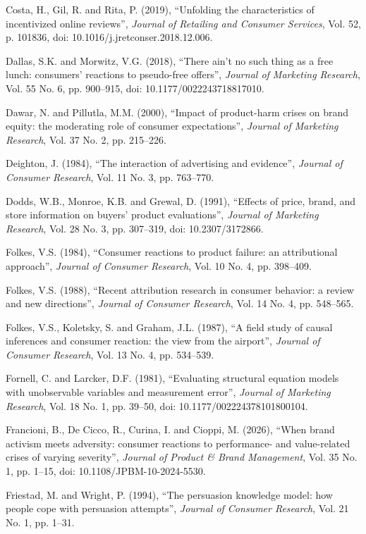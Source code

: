 \documentclass[12pt, a4paper]{article}
\newenvironment{referenceshang}{%
  \par\begingroup
  \setlength{\parindent}{0pt}%
  \setlength{\parskip}{0.5\baselineskip}%
  \everypar{\hangindent=1.5em\hangafter=1\relax}%
  \ignorespaces
}{%
  \par\endgroup
}
\begin{document}
\begin{referenceshang}
Costa, H., Gil, R. and Rita, P. (2019), ``Unfolding the characteristics of incentivized online reviews'', \emph{Journal of Retailing and Consumer Services}, Vol. 52, p. 101836, doi: 10.1016/j.jretconser.2018.12.006.

Dallas, S.K. and Morwitz, V.G. (2018), ``There ain't no such thing as a free lunch: consumers' reactions to pseudo-free offers'', \emph{Journal of Marketing Research}, Vol. 55 No. 6, pp. 900--915, doi: 10.1177/0022243718817010.

Dawar, N. and Pillutla, M.M. (2000), ``Impact of product-harm crises on brand equity: the moderating role of consumer expectations'', \emph{Journal of Marketing Research}, Vol. 37 No. 2, pp. 215--226.

Deighton, J. (1984), ``The interaction of advertising and evidence'', \emph{Journal of Consumer Research}, Vol. 11 No. 3, pp. 763--770.

Dodds, W.B., Monroe, K.B. and Grewal, D. (1991), ``Effects of price, brand, and store information on buyers' product evaluations'', \emph{Journal of Marketing Research}, Vol. 28 No. 3, pp. 307--319, doi: 10.2307/3172866.

Folkes, V.S. (1984), ``Consumer reactions to product failure: an attributional approach'', \emph{Journal of Consumer Research}, Vol. 10 No. 4, pp. 398--409.

Folkes, V.S. (1988), ``Recent attribution research in consumer behavior: a review and new directions'', \emph{Journal of Consumer Research}, Vol. 14 No. 4, pp. 548--565.

Folkes, V.S., Koletsky, S. and Graham, J.L. (1987), ``A field study of causal inferences and consumer reaction: the view from the airport'', \emph{Journal of Consumer Research}, Vol. 13 No. 4, pp. 534--539.

Fornell, C. and Larcker, D.F. (1981), ``Evaluating structural equation models with unobservable variables and measurement error'', \emph{Journal of Marketing Research}, Vol. 18 No. 1, pp. 39--50, doi: 10.1177/002224378101800104.

Francioni, B., De Cicco, R., Curina, I. and Cioppi, M. (2026), ``When brand activism meets adversity: consumer reactions to performance- and value-related crises of varying severity'', \emph{Journal of Product \& Brand Management}, Vol. 35 No. 1, pp. 1--15, doi: 10.1108/JPBM-10-2024-5530.

Friestad, M. and Wright, P. (1994), ``The persuasion knowledge model: how people cope with persuasion attempts'', \emph{Journal of Consumer Research}, Vol. 21 No. 1, pp. 1--31.


\end{referenceshang}
\end{document}
